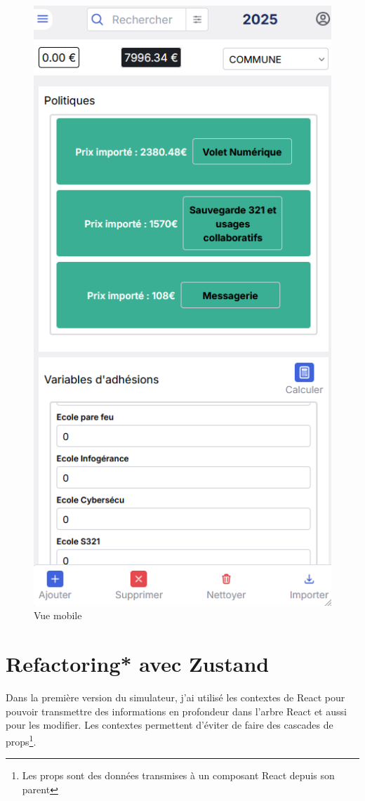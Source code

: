 \documentclass[a4paper,12pt]{report}
\begin{document}
\begin{figure}[H]
    \centering
    \includegraphics[scale=0.4]{vueMobile.png}
    \caption{Vue mobile}
    \label{fig:mobile-view}
\end{figure}


\section{Refactoring* avec Zustand}
Dans la première version du simulateur, j'ai utilisé les contextes de React pour pouvoir transmettre des informations en profondeur dans l'arbre React et aussi pour les modifier. Les contextes permettent d'éviter de faire des cascades de props\footnote{Les props sont des données transmises à un composant React depuis son parent}.
\end{document}
